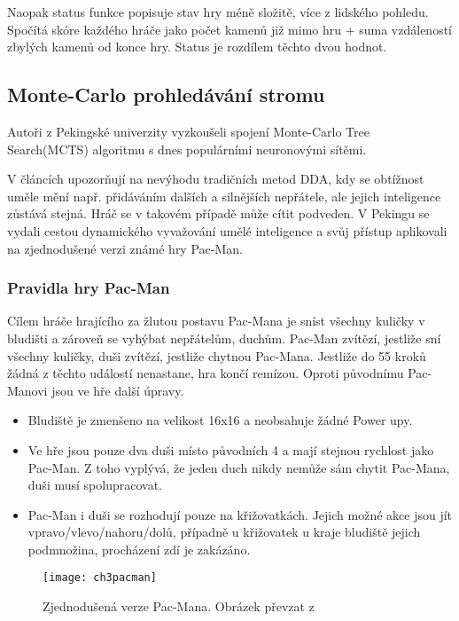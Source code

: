 Naopak status funkce popisuje stav hry méně složitě, více z lidského pohledu. Spočítá skóre každého hráče jako počet kamenů již mimo hru + suma vzdáleností zbylých kamenů od konce hry. Status je rozdílem těchto dvou hodnot.

\subsection{Monte-Carlo prohledávání stromu} 

Autoři z Pekingské univerzity vyzkoušeli spojení Monte-Carlo Tree Search(MCTS) algoritmu s dnes populárními neuronovými sítěmi. \cite{18Pac1}\cite{19Pac2}

V článcích upozorňují na nevýhodu tradičních metod DDA, kdy se obtížnost uměle mění např. přidáváním dalších a silnějších nepřátele, ale jejich inteligence zůstává stejná. Hráč se v takovém případě může cítit podveden. V Pekingu se vydali cestou dynamického vyvažování umělé inteligence a svůj přístup aplikovali na zjednodušené verzi známé hry Pac-Man.

\subsubsection{Pravidla hry Pac-Man}

Cílem hráče hrajícího za žlutou postavu Pac-Mana je sníst všechny kuličky v bludišti a zároveň se vyhýbat nepřátelům, duchům. Pac-Man zvítězí, jestliže sní všechny kuličky, duši zvítězí, jestliže chytnou Pac-Mana. Jestliže do 55 kroků žádná z těchto událostí nenastane, hra končí remízou. Oproti původnímu Pac-Manovi jsou ve hře další úpravy.


\begin{itemize}
	\item Bludiště je zmenšeno na velikost 16x16 a neobsahuje žádné Power upy.
	\item Ve hře jsou pouze dva duši místo původních 4 a mají stejnou rychlost jako Pac-Man. Z toho vyplývá, že jeden duch nikdy nemůže sám chytit Pac-Mana, duši musí spolupracovat.
	\item Pac-Man i duši se rozhodují pouze na křižovatkách. Jejich možné akce jsou jít vpravo/vlevo/nahoru/dolů, případně u křižovatek u kraje bludiště jejich podmnožina, procházení zdí je zakázáno.
\end{itemize}

\begin{figure}
  \centering
  \texttt{[image: ch3pacman]}
	\caption{Zjednodušená verze Pac-Mana. Obrázek převzat z \cite{18Pac1}}
	\label{fig:ch3pacman}
\end{figure}

